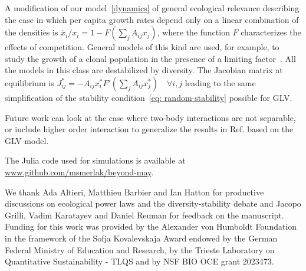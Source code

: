 \documentclass[
 prl,
 twocolumn,
 amsmath,
 amssymb,
 aps,
]{revtex4-2}
\begin{document}
A modification of our model~\eqref{dynamics} of general ecological relevance describing the case in which per capita growth rates depend only on a linear combination of the densities is $\dot{x_i}/x_i=1-F(\sum_jA_{ij}x_j)$, where the function $F$ characterizes the effects of competition.
General models of this kind are used, for example, to study the growth of a clonal population in the presence of a limiting factor~\cite{mazzolini2023universality}.
All the models in this class are destabilized by diversity.
The Jacobian matrix at equilibrium is $J_{ij}^*=-A_{ij}x_i^*F'(\sum_jA_{ij}x_j^*) \quad \forall i,j$ leading to the same simplification of the stability condition~\eqref{eq: random-stability} possible for GLV.

Future work can look at the case where two-body interactions are not separable, or include higher order interaction to generalize the results in Ref. \cite{Gibbs2022} based on the GLV model. 

\medskip

The Julia code used for simulations is available at \url{www.github.com/msmerlak/beyond-may}.

\medskip

\begin{acknowledgments}
We thank Ada Altieri, Matthieu Barbier and Ian Hatton for productive discussions on ecological power laws and the diversity-stability debate and Jacopo Grilli, Vadim Karatayev and Daniel Reuman for feedback on the manuscript.
Funding for this work was provided by the Alexander von Humboldt Foundation in the framework of the Sofja Kovalevskaja Award endowed by the German Federal Ministry of Education and Research, by the Trieste Laboratory on Quantitative Sustainability - TLQS and by NSF BIO OCE grant 2023473.
\end{acknowledgments}

\medskip



\end{document}
